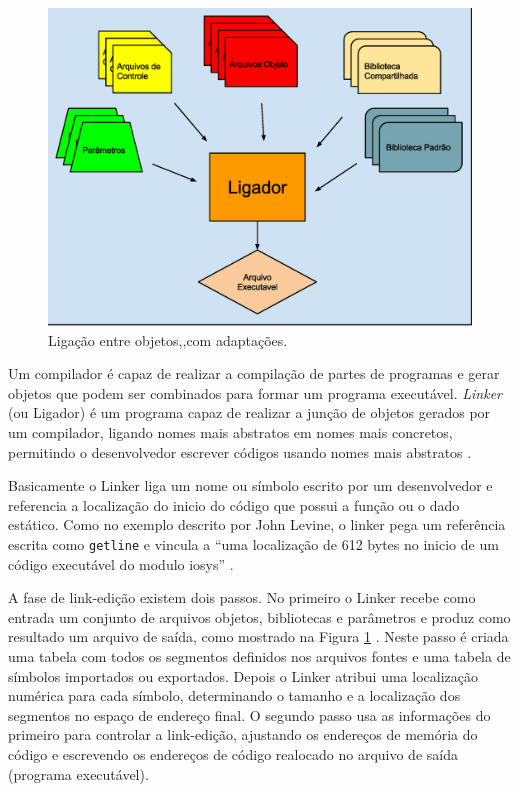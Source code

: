 \begin{figure}[h]
    \centering
        \includegraphics[keepaspectratio=true,scale=0.5]{figuras/ligador.eps}
    \caption{Ligação entre objetos,\cite[pag. 7]{ref36},com adaptações.}
    \label{fig03}
\end{figure}

Um compilador é capaz de realizar a compilação de partes de programas e gerar
 objetos que podem ser combinados para formar um programa executável. 
\textit{Linker} (ou Ligador) é um programa capaz de realizar a junção 
de objetos gerados por um compilador, ligando nomes mais abstratos em nomes
 mais concretos, permitindo o desenvolvedor escrever códigos usando nomes 
mais abstratos \cite{ref36}.


 Basicamente o Linker liga um nome ou símbolo escrito por um desenvolvedor e
 referencia a localização do inicio do código que possui a função ou o dado
 estático. Como no exemplo descrito por John Levine, o linker pega um 
referência escrita como \texttt{getline}  e vincula a “uma localização de 612 bytes 
no inicio de um código executável do modulo iosys” \cite[pag.7]{ref36}. 

A fase de link-edição existem dois passos. No primeiro o Linker recebe como 
entrada um conjunto de arquivos objetos, bibliotecas e parâmetros e produz
 como resultado um arquivo de saída, como mostrado na Figura \ref{fig03}
 \cite[pag.13]{ref36}. Neste passo é criada uma tabela com 
todos os segmentos definidos nos arquivos fontes e uma tabela de símbolos 
importados ou exportados. Depois o Linker atribui uma localização numérica 
para cada símbolo, determinando o tamanho e a localização dos segmentos no
 espaço de endereço final. O segundo passo usa as informações do primeiro
 para controlar a link-edição, ajustando os endereços de memória do código e
 escrevendo os endereços de código realocado no arquivo de saída
 (programa executável).



